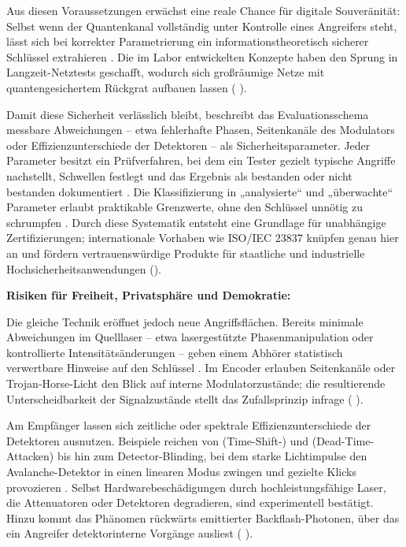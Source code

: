 {Aus diesen Voraussetzungen erwächst eine reale Chance für digitale Souveränität: Selbst wenn der Quantenkanal vollständig unter Kontrolle eines Angreifers steht, lässt sich bei korrekter Parametrierung ein informationstheoretisch sicherer Schlüssel extrahieren . Die im Labor entwickelten Konzepte haben den Sprung in Langzeit-Netztests geschafft, wodurch sich großräumige Netze mit quantengesichertem Rückgrat aufbauen lassen (\cite{sunReviewSecurityEvaluation2022} ).

Damit diese Sicherheit verlässlich bleibt, beschreibt das Evaluationsschema messbare Abweichungen – etwa fehlerhafte Phasen, Seitenkanäle des Modulators oder Effizienzunterschiede der Detektoren – als Sicherheitsparameter. Jeder Parameter besitzt ein Prüfverfahren, bei dem ein Tester gezielt typische Angriffe nachstellt, Schwellen festlegt und das Ergebnis als bestanden oder nicht bestanden dokumentiert . Die Klassifizierung in „analysierte“ und „überwachte“ Parameter erlaubt praktikable Grenzwerte, ohne den Schlüssel unnötig zu schrumpfen . Durch diese Systematik entsteht eine Grundlage für unabhängige Zertifizierungen; internationale Vorhaben wie ISO/IEC 23837 knüpfen genau hier an und fördern vertrauenswürdige Produkte für staatliche und industrielle Hochsicherheitsanwendungen (\cite{sunReviewSecurityEvaluation2022}).

\textbf{Risiken für Freiheit, Privatsphäre und Demokratie:}

Die gleiche Technik eröffnet jedoch neue Angriffsflächen. Bereits minimale Abweichungen im Quelllaser – etwa lasergestützte Phasenmanipulation oder kontrollierte Intensitätsänderungen – geben einem Abhörer statistisch verwertbare Hinweise auf den Schlüssel . Im Encoder erlauben Seitenkanäle oder Trojan-Horse-Licht den Blick auf interne Modulatorzustände; die resultierende Unterscheidbarkeit der Signalzustände stellt das Zufallsprinzip infrage (\cite{sunReviewSecurityEvaluation2022} ).

Am Empfänger lassen sich zeitliche oder spektrale Effizienzunterschiede der Detektoren ausnutzen. Beispiele reichen von (Time-Shift-) und (Dead-Time-Attacken) bis hin zum Detector-Blinding, bei dem starke Lichtimpulse den Avalanche-Detektor in einen linearen Modus zwingen und gezielte Klicks provozieren . Selbst Hardwarebeschädigungen durch hochleistungsfähige Laser, die Attenuatoren oder Detektoren degradieren, sind experimentell bestätigt. Hinzu kommt das Phänomen rückwärts emittierter Backflash-Photonen, über das ein Angreifer detektorinterne Vorgänge ausliest (\cite{sunReviewSecurityEvaluation2022} ).

}
